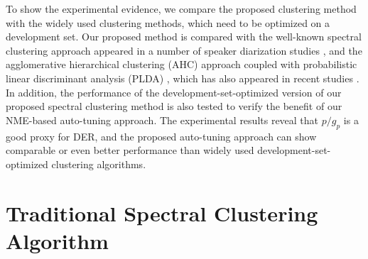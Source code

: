 \documentclass[journal]{IEEEtran}
\begin{document}
To show the experimental evidence, we compare the proposed clustering method with the widely used clustering methods, which need to be optimized on a development set. Our proposed method is compared with the well-known spectral clustering approach \cite{ng2002spectral} appeared in a number of speaker diarization studies \cite{ning2006spectral, shum2012use, luque2012}, and the agglomerative hierarchical clustering (AHC) approach coupled with probabilistic linear discriminant analysis (PLDA) \cite{ioffe2006probabilistic, prince2007probabilistic}, which has also appeared in recent studies \cite{garcia2017speaker, sell2018diarization, snyder_git}. In addition, the performance of the development-set-optimized version of our proposed spectral clustering method is also tested to verify the benefit of our NME-based auto-tuning approach. The experimental results reveal that $p/g_p$ is a good proxy for DER, and the proposed auto-tuning approach can show comparable or even better performance than widely used development-set-optimized clustering algorithms.
\vspace{-1.0ex}
\section{Traditional Spectral Clustering Algorithm}
\end{document}
